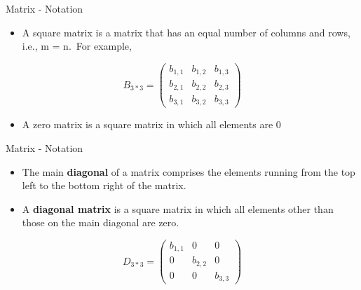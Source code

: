 \documentclass[
  ignorenonframetext,
]{beamer}
\providecommand{\tightlist}{%
  \setlength{\itemsep}{0pt}\setlength{\parskip}{0pt}}
\begin{document}
\begin{frame}{Matrix - Notation}
\protect\hypertarget{matrix---notation-3}{}

\begin{itemize}
\tightlist
\item
  A square matrix is a matrix that has an equal number of columns and
  rows, i.e., m = n.~For example,
\end{itemize}

\[B_{3*3} =
 \begin{pmatrix}
  b_{1,1} & b_{1,2} & b_{1,3} \\
  b_{2,1} & b_{2,2} & b_{2,3} \\
  b_{3,1} & b_{3,2} & b_{3,3} 
 \end{pmatrix}\]

\begin{itemize}
\tightlist
\item
  A zero matrix is a square matrix in which all elements are 0
\end{itemize}

\end{frame}

\begin{frame}{Matrix - Notation}
\protect\hypertarget{matrix---notation-4}{}

\begin{itemize}
\item
  The main \textbf{diagonal} of a matrix comprises the elements running
  from the top left to the bottom right of the matrix.
\item
  A \textbf{diagonal matrix} is a square matrix in which all elements
  other than those on the main diagonal are zero.
\end{itemize}

\[D_{3*3} =
 \begin{pmatrix}
  b_{1,1} & 0 & 0 \\
  0 & b_{2,2} & 0 \\
  0 & 0 & b_{3,3} 
 \end{pmatrix}\]

\end{frame}
\end{document}
